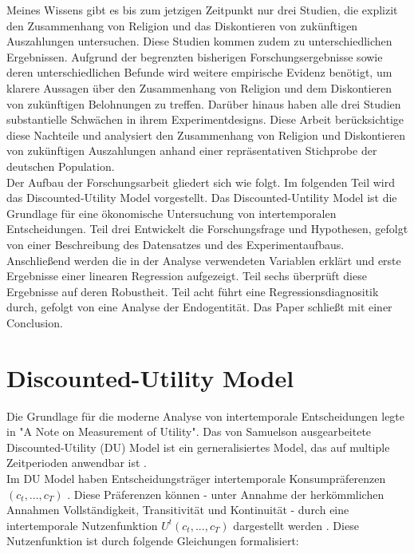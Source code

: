 \documentclass[11pt,a4paper]{article}
\begin{document}
Meines Wissens gibt es bis zum jetzigen Zeitpunkt nur drei Studien, die explizit den Zusammenhang von Religion und das Diskontieren von zukünftigen Auszahlungen untersuchen. Diese Studien kommen zudem zu unterschiedlichen Ergebnissen. Aufgrund der begrenzten bisherigen Forschungsergebnisse sowie deren unterschiedlichen Befunde wird weitere empirische Evidenz benötigt, um klarere Aussagen über den  Zusammenhang von Religion und dem Diskontieren von zukünftigen Belohnungen zu treffen. Darüber hinaus haben alle drei Studien substantielle Schwächen in ihrem Experimentdesigns. Diese Arbeit berücksichtige diese Nachteile und analysiert den Zusammenhang von Religion und Diskontieren von zukünftigen Auszahlungen anhand einer repräsentativen Stichprobe der deutschen Population.\\ 
 
Der Aufbau der Forschungsarbeit gliedert sich wie folgt. Im folgenden Teil wird das Discounted-Utility Model vorgestellt. Das Discounted-Untility Model ist die Grundlage für eine ökonomische Untersuchung von intertemporalen Entscheidungen. Teil drei Entwickelt die Forschungsfrage und Hypothesen, gefolgt von einer Beschreibung des Datensatzes und des Experimentaufbaus. Anschließend werden die in der Analyse verwendeten Variablen erklärt und erste Ergebnisse einer linearen Regression aufgezeigt. Teil sechs überprüft diese Ergebnisse auf deren Robustheit. Teil acht führt eine Regressionsdiagnositik durch, gefolgt von eine Analyse der Endogentität. Das Paper schließt mit einer Conclusion. 


\section{Discounted-Utility Model}
Die Grundlage für die moderne Analyse von intertemporale Entscheidungen legte \textcite{samuelson1937note} in "A Note on Measurement of Utility". Das von Samuelson ausgearbeitete Discounted-Utility (DU) Model ist ein gerneralisiertes Model, das auf multiple Zeitperioden anwendbar ist \parencite{frederick2002time}.\\

Im DU Model haben Entscheidungsträger intertemporale Konsumpräferenzen $(c_t,...,c_T)$ \parencite{frederick2002time}. Diese Präferenzen können - unter Annahme der herkömmlichen Annahmen Vollständigkeit, Transitivität und Kontinuität -  durch eine intertemporale Nutzenfunktion $U^{t}(c_{t},...,c_{T}) $ dargestellt werden \parencite{frederick2002time}. Diese Nutzenfunktion ist durch folgende Gleichungen formalisiert: 
\end{document}
